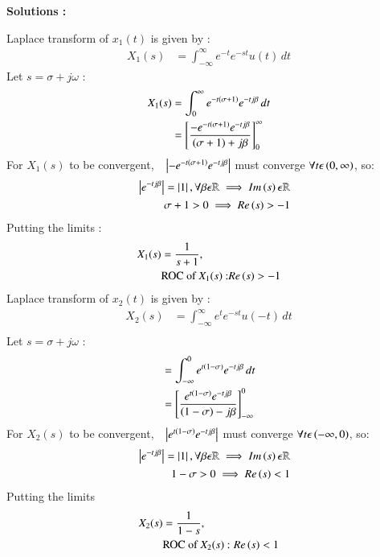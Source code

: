 \documentclass[journal,12pt,onecolumn]{IEEEtran}
\theoremstyle{remark}
\begin{document}
\textbf{Solutions :}
    
Laplace transform of $x_1(t)$ is given by :
\begin{align}
    X_1(s) &=  \int_{-\infty}^{\infty} e^{-t}e^{-st}u(t) \,dt
    \end{align}
    Let $s=\sigma+j\omega$ :
\begin{align}
 X_1(s) &= \int_{0}^{\infty}e^{-t\left(\sigma+1\right)}e^{-tj\beta} \,dt\\
       &=  \left[\frac{-e^{-t\left(\sigma+1\right)}e^{-tj\beta}}{\left(\sigma+1\right)+j\beta}\right]_{0}^{\infty}  \\
       \end{align}
        For $X_1(s)$ to be convergent,$\quad\left\vert-e^{-t\left(\sigma+1\right)}e^{-tj\beta}\right\vert$ must converge $\forall t \epsilon \left(0,\infty\right)$, so:
        \begin{align}
\quad\left\vert e^{-tj\beta}\right\vert = \left\vert1\right\vert, \forall \beta \epsilon \mathbb{R} \implies Im\left(s\right) \epsilon \mathbb{R}\\
\sigma + 1 > 0 \implies  Re\left(s\right)>-1   
        \end{align}
Putting the limits :
       \begin{align}
X_1(s)&= \frac{1}{s+1} , \\ &\text{ROC of $X_1(s)$ :} Re\left(s\right) > -1
\end{align}
Laplace transform of $x_2(t)$ is given by :
\begin{align}
    X_2(s) &=  \int_{-\infty}^{\infty} e^{t}e^{-st}u(-t) \,dt\\
        \end{align}
    Let $s=\sigma+j\omega$ :
\begin{align}
    &= \int_{-\infty}^{0}e^{t\left(1-\sigma\right)}e^{-tj\beta} \,dt\\
      &=  \left[\frac{e^{t\left(1-\sigma\right)}e^{-tj\beta}}{\left(1-\sigma\right)-j\beta}\right]_{-\infty}^{0}  
     \end{align}
      For $X_2(s)$ to be convergent,$\quad\left\vert e^{t\left(1-\sigma\right)}e^{-tj\beta}\right\vert$ must converge $\forall t\epsilon\left(-\infty,0\right)$, so:
     \begin{align}
\quad\left\vert e^{-tj\beta}\right\vert = \left\vert1\right\vert, \forall \beta \epsilon \mathbb{R} \implies Im\left(s\right) \epsilon \mathbb{R}\\
1-\sigma > 0 \implies  Re\left(s\right) < 1 
        \end{align}
Putting the limits 
     \begin{align}
            X_2(s)&= \frac{1}{1-s} , \\ &\text{ROC of $X_2(s)$ : }Re\left(s\right) < 1
\end{align}
\end{document}
